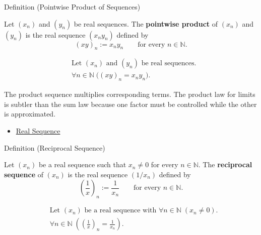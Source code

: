 \begin{definitionbox}{Definition (Pointwise Product of Sequences)}
\begin{definition}
\label{def:pointwise-product-sequence}
Let $(x_n)$ and $(y_n)$ be real sequences. The \textbf{pointwise product}
of $(x_n)$ and $(y_n)$ is the real sequence $(x_ny_n)$ defined by
\[
(xy)_n := x_ny_n
\qquad
\text{for every } n\in\mathbb{N}.
\]
\end{definition}
\end{definitionbox}

\begin{remark*}
\[
\begin{aligned}
&\text{Let } (x_n) \text{ and } (y_n) \text{ be real sequences.}\\
&\forall n\in\mathbb{N}\;\bigl((xy)_n=x_ny_n\bigr).
\end{aligned}
\]
\end{remark*}

\begin{remark*}[Interpretation]
The product sequence multiplies corresponding terms. The product law for
limits is subtler than the sum law because one factor must be controlled while
the other is approximated.
\end{remark*}

\begin{dependencies}
\begin{itemize}
  \item \hyperref[def:real-sequence]{Real Sequence}
\end{itemize}
\end{dependencies}


\begin{definitionbox}{Definition (Reciprocal Sequence)}
\begin{definition}
\label{def:reciprocal-sequence}
Let $(x_n)$ be a real sequence such that $x_n\neq 0$ for every
$n\in\mathbb{N}$. The \textbf{reciprocal sequence} of $(x_n)$ is the real
sequence $(1/x_n)$ defined by
\[
\left(\frac{1}{x}\right)_n := \frac{1}{x_n}
\qquad
\text{for every } n\in\mathbb{N}.
\]
\end{definition}
\end{definitionbox}

\begin{remark*}
\[
\begin{aligned}
&\text{Let } (x_n) \text{ be a real sequence with }
  \forall n\in\mathbb{N}\;(x_n\neq 0).\\
&\forall n\in\mathbb{N}\;
\left(\left(\frac{1}{x}\right)_n=\frac{1}{x_n}\right).
\end{aligned}
\]
\end{remark*}

